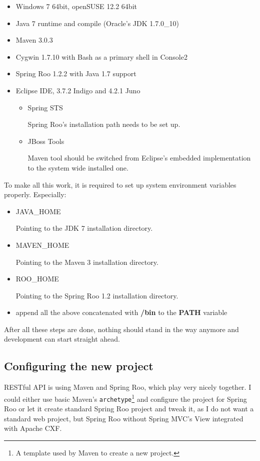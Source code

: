 	\begin{itemize}
		\item Windows 7 64bit, openSUSE 12.2 64bit
		\item Java 7 runtime  and compile (Oracle's JDK 1.7.0\_10)
		\item Maven 3.0.3
		\item Cygwin 1.7.10 with Bash as a primary shell in Console2
		\item Spring Roo 1.2.2 with Java 1.7 support
		\item Eclipse IDE, 3.7.2 Indigo and 4.2.1 Juno
		\begin{itemize}
			\item Spring STS
			
			Spring Roo's installation path needs to be set up.
			\item JBoss Tools  
			
			Maven tool should be switched from Eclipse's embedded implementation to the system wide installed one.
		\end{itemize}
	\end{itemize}
	
	To make all this work, it is required to set up system environment variables properly. Especially:
	
	\begin{itemize}
		\item JAVA\_HOME
		
		Pointing to the JDK 7 installation directory.
		\item MAVEN\_HOME
		
		Pointing to the Maven 3 installation directory.
		\item ROO\_HOME
		
		Pointing to the Spring Roo 1.2 installation directory.
		\item append all the above concatenated with \textbf{/bin} to the \textbf{PATH} variable 
	\end{itemize}
	
	After all these steps are done, nothing should stand in the way anymore and development can start straight ahead.
	
	\subsection{Configuring the new project}
	
	RESTful API is using Maven and Spring Roo, which play very nicely together. I could either use basic Maven's
	\verb|archetype|\footnote{A template used by Maven to create a new project.} and configure the project for Spring Roo
	or let it create standard Spring Roo project and tweak it, as I do not want a standard web project, but Spring Roo
	without Spring MVC's View integrated with Apache CXF.
	
